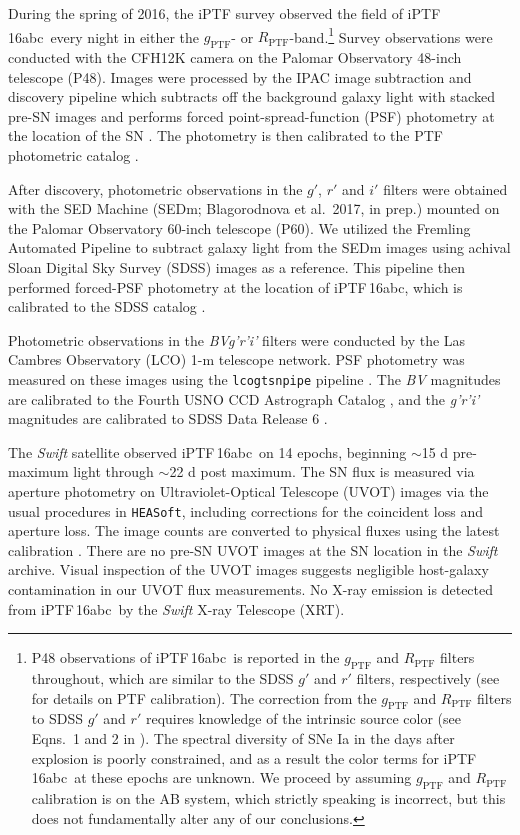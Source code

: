 \documentclass[twocolumn]{aastex61}
\newcommand{\abc}{iPTF\,16abc}
\begin{document}
During the spring of 2016, the iPTF survey observed the field of \abc\ every night in either the $g_\mathrm{PTF}$- or 
$R_\mathrm{PTF}$-band.\footnote{P48 observations of \abc\ is reported in the $g_\mathrm{PTF}$ and $R_\mathrm{PTF}$ filters throughout, which are similar to the SDSS $g'$ and $r'$ filters, respectively (see \citealt{2012PASP..124..854O} for details on PTF calibration). The correction from the $g_\mathrm{PTF}$ and $R_\mathrm{PTF}$ filters to SDSS $g'$ and $r'$ requires knowledge of the intrinsic source color (see Eqns.~1 and 2 in \citealt{2012PASP..124..854O}). The spectral diversity of SNe Ia in the days after explosion is poorly constrained, and as a result the color terms for \abc\ at these epochs are unknown. We proceed by assuming $g_\mathrm{PTF}$ and $R_\mathrm{PTF}$ calibration is on the AB system, which strictly speaking is incorrect, but this does not fundamentally alter any of our conclusions.} 
Survey observations were conducted with the
CFH12K camera \citep{2000SPIE.3965...58S} on the Palomar Observatory 
48-inch telescope (P48). Images were processed by the IPAC image
subtraction and discovery pipeline which subtracts off the background
galaxy light with stacked pre-SN images and performs forced
point-spread-function (PSF) photometry at the location of the SN 
\citep{2017PASP..129a4002M}. The
photometry is then calibrated to the PTF photometric catalog
\citep{2012PASP..124..854O}.

After discovery, photometric observations in the $g'$, $r'$ and $i'$
filters were obtained with the SED Machine 
(SEDm; Blagorodnova et al.\ 2017, in prep.) mounted on the Palomar Observatory 
60-inch telescope (P60). We utilized the Fremling Automated Pipeline \citep{2016A&A...593A..68F} to subtract galaxy light from the SEDm images using achival Sloan Digital Sky Survey (SDSS) images as a reference. This pipeline then performed forced-PSF photometry at the location of \abc, which is calibrated to the SDSS catalog \citep{2014ApJS..211...17A}.

Photometric observations in the \textit{BVg'r'i'} filters were conducted by the Las Cambres Observatory (LCO) 1-m
telescope network.  PSF photometry was measured on these images using
the \texttt{lcogtsnpipe} pipeline \citep{2016MNRAS.459.3939V}. The
\textit{BV} magnitudes are calibrated to the Fourth USNO CCD
Astrograph Catalog \citep{2013AJ....145...44Z}, and the \textit{g'r'i'}
magnitudes are calibrated to SDSS Data Release 6
\citep{2008ApJS..175..297A}.

The \textit{Swift} satellite observed \abc\ on 14 epochs, beginning 
$\sim$15 d pre-maximum light through $\sim$22 d post maximum. The SN 
flux is measured via aperture photometry on Ultraviolet-Optical
Telescope (UVOT) images via the usual procedures in 
\texttt{HEASoft}, including corrections for the coincident loss and 
aperture loss. The image counts
are converted to physical fluxes using the latest calibration
\citep{2011AIPC.1358..373B}. There are no pre-SN UVOT images at the 
SN location in the \textit{Swift} archive.  Visual inspection of the
UVOT images suggests negligible host-galaxy contamination in our 
UVOT flux measurements. No X-ray emission is detected from \abc\ by the \textit{Swift} X-ray Telescope (XRT).
\end{document}
